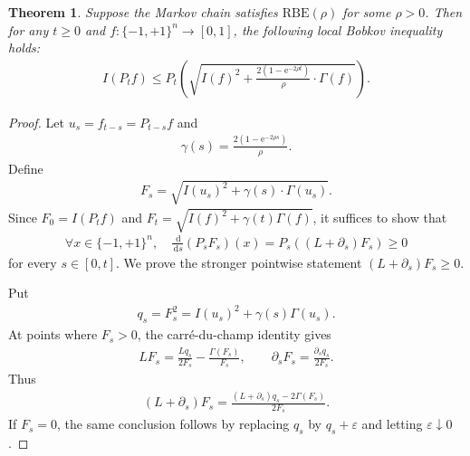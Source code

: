 \documentclass[11pt]{article}
\theoremstyle{plain}
\newtheorem{theorem}{Theorem}[section]
\theoremstyle{definition}
\theoremstyle{remark}
\newcommand{\dif}{\,\mathrm{d}}
\newcommand{\e}{\mathrm{e}}
\newcommand{\tuple}[1]{\left(#1\right)}
\newcommand{\tp}{\tuple}
\begin{document}
\begin{theorem}
    Suppose the Markov chain satisfies $\mathrm{RBE}(\rho)$ for some $\rho>0$.
    Then for any $t\ge0$ and $f:\{-1,+1\}^n\to[0,1]$, the following local Bobkov inequality holds:
    \begin{align*}
        I\tp{P_t f}
        \le
        P_t \tp{\sqrt{I(f)^2 + \frac{2(1-\e^{-2\rho t})}{\rho} \cdot \Gamma(f)}}.
    \end{align*}
\end{theorem}

\begin{proof}
    Let $u_s=f_{t-s}=P_{t-s}f$ and
    \begin{align*}
        \gamma(s)=\frac{2(1-\e^{-2\rho s})}{\rho}.
    \end{align*}
    Define
    \begin{align*}
        F_s = \sqrt{I(u_s)^2 + \gamma(s) \cdot \Gamma(u_s)}.
    \end{align*}
    Since $F_0=I(P_t f)$ and
    $F_t=\sqrt{I(f)^2+\gamma(t)\Gamma(f)}$, it suffices to show that
    \begin{align*}
       \forall x \in \{-1,+1\}^n,\quad \frac{\dif}{\dif s}(P_s F_s)(x) = P_s((L+\partial_s) F_s) \ge 0
    \end{align*}
    for every $s\in[0,t]$. We prove the stronger pointwise statement
    $(L+\partial_s)F_s\ge0$.

    Put
    \begin{align*}
        q_s=F_s^2=I(u_s)^2+\gamma(s)\Gamma(u_s).
    \end{align*}
    At points where $F_s>0$, the carré-du-champ identity gives
    \begin{align*}
        L F_s
        =
        \frac{Lq_s}{2F_s}-\frac{\Gamma(F_s)}{F_s},
        \qquad
        \partial_s F_s=\frac{\partial_s q_s}{2F_s}.
    \end{align*}
    Thus
    \begin{align}\label{eq:LF-reduction}
        (L+\partial_s)F_s
        =
        \frac{(L+\partial_s)q_s-2\Gamma(F_s)}{2F_s}.
    \end{align}
    If $F_s=0$, the same conclusion follows by replacing $q_s$ by
    $q_s+\varepsilon$ and letting $\varepsilon\downarrow0$.


\end{proof}
\end{document}

